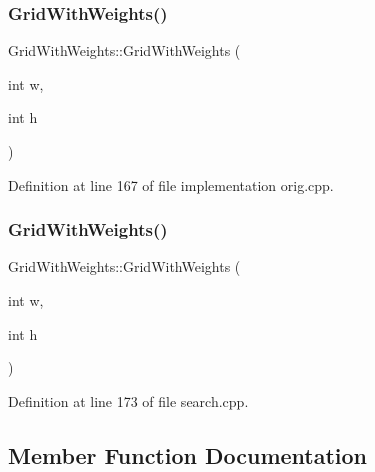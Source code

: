 \subsubsection{\texorpdfstring{Grid\+With\+Weights()}{GridWithWeights()}\hspace{0.1cm}{\footnotesize\ttfamily [1/2]}}
{\footnotesize\ttfamily Grid\+With\+Weights\+::\+Grid\+With\+Weights (\begin{DoxyParamCaption}\item[{int}]{w,  }\item[{int}]{h }\end{DoxyParamCaption})\hspace{0.3cm}{\ttfamily [inline]}}



Definition at line 167 of file implementation orig.\+cpp.

\mbox{\label{struct_grid_with_weights_ad9eb67bf93deb3409ecf658288bc78f6}} 
\subsubsection{\texorpdfstring{Grid\+With\+Weights()}{GridWithWeights()}\hspace{0.1cm}{\footnotesize\ttfamily [2/2]}}
{\footnotesize\ttfamily Grid\+With\+Weights\+::\+Grid\+With\+Weights (\begin{DoxyParamCaption}\item[{int}]{w,  }\item[{int}]{h }\end{DoxyParamCaption})\hspace{0.3cm}{\ttfamily [inline]}}



Definition at line 173 of file search.\+cpp.



\subsection{Member Function Documentation}
\mbox{\label{struct_grid_with_weights_a999c39922a9b507e4436b817592a7ff9}} 
